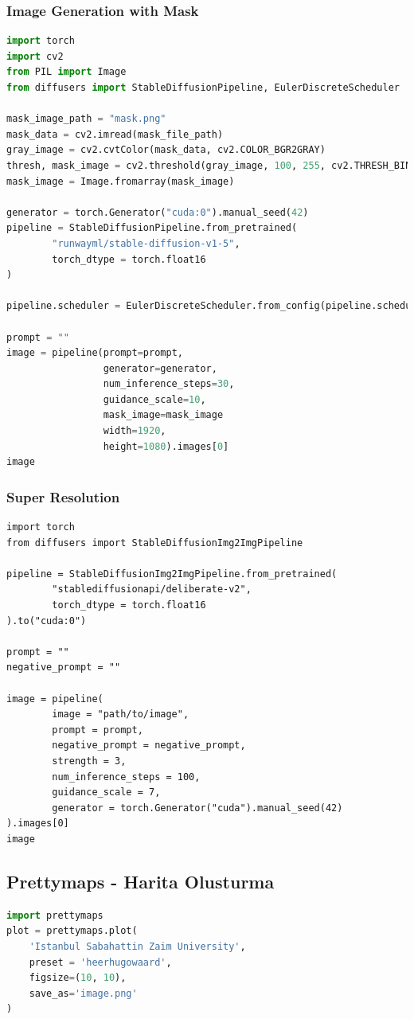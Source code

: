 \subsubsection{Image Generation with Mask}
\begin{lstlisting}[language=Python]
import torch
import cv2
from PIL import Image
from diffusers import StableDiffusionPipeline, EulerDiscreteScheduler

mask_image_path = "mask.png"
mask_data = cv2.imread(mask_file_path)
gray_image = cv2.cvtColor(mask_data, cv2.COLOR_BGR2GRAY)
thresh, mask_image = cv2.threshold(gray_image, 100, 255, cv2.THRESH_BINARY)
mask_image = Image.fromarray(mask_image)

generator = torch.Generator("cuda:0").manual_seed(42)
pipeline = StableDiffusionPipeline.from_pretrained(
        "runwayml/stable-diffusion-v1-5",
        torch_dtype = torch.float16
)

pipeline.scheduler = EulerDiscreteScheduler.from_config(pipeline.scheduler.config)

prompt = ""
image = pipeline(prompt=prompt,
                 generator=generator,
                 num_inference_steps=30,
                 guidance_scale=10,
                 mask_image=mask_image
                 width=1920,
                 height=1080).images[0]
image
\end{lstlisting}

\subsubsection{Super Resolution}
\begin{lstlisting}
import torch
from diffusers import StableDiffusionImg2ImgPipeline

pipeline = StableDiffusionImg2ImgPipeline.from_pretrained(
        "stablediffusionapi/deliberate-v2",
        torch_dtype = torch.float16
).to("cuda:0")

prompt = ""
negative_prompt = ""

image = pipeline(
        image = "path/to/image",
        prompt = prompt,
        negative_prompt = negative_prompt,
        strength = 3,
        num_inference_steps = 100,
        guidance_scale = 7,
        generator = torch.Generator("cuda").manual_seed(42)
).images[0]
image
\end{lstlisting}

\subsection{Prettymaps - Harita Olusturma}
\begin{lstlisting}[language=Python]
import prettymaps
plot = prettymaps.plot(
    'Istanbul Sabahattin Zaim University',
    preset = 'heerhugowaard',
    figsize=(10, 10),
    save_as='image.png'
)
\end{lstlisting}


